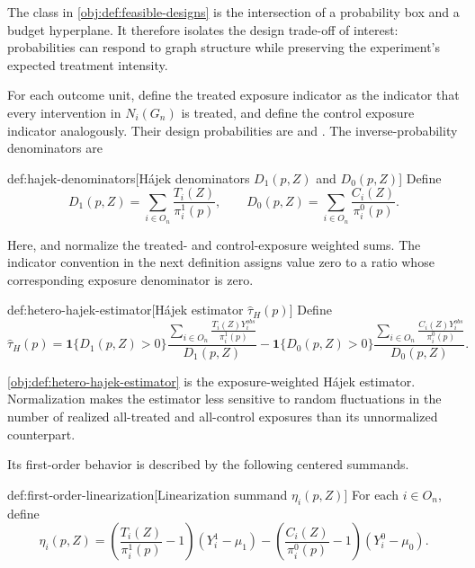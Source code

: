 The class in \cref{obj:def:feasible-designs} is the intersection of a probability box and a budget hyperplane. It therefore isolates the design trade-off of interest: probabilities can respond to graph structure while preserving the experiment's expected treatment intensity.

For each outcome unit, define the treated exposure indicator  as the indicator that every intervention in \(N_i(G_n)\) is treated, and define the control exposure indicator  analogously. Their design probabilities are  and . The inverse-probability denominators are

\begin{definitionv}{def:hajek-denominators}[Hájek denominators $D_1(p,Z)$ and $D_0(p,Z)$]
Define
\[
D_1(p,Z)=\sum_{i\in O_n}\frac{T_i(Z)}{\pi_i^1(p)},
\qquad
D_0(p,Z)=\sum_{i\in O_n}\frac{C_i(Z)}{\pi_i^0(p)}.
\]
\end{definitionv}

Here,  and  normalize the treated- and control-exposure weighted sums. The indicator convention in the next definition assigns value zero to a ratio whose corresponding exposure denominator is zero.

\begin{definitionv}{def:hetero-hajek-estimator}[Hájek estimator $\widehat\tau_H(p)$]
Define
\[
\widehat\tau_H(p)
=
\mathbf 1\{D_1(p,Z)>0\}
\frac{\displaystyle\sum_{i\in O_n}\frac{T_i(Z)Y_i^{obs}}{\pi_i^1(p)}}{D_1(p,Z)}
-
\mathbf 1\{D_0(p,Z)>0\}
\frac{\displaystyle\sum_{i\in O_n}\frac{C_i(Z)Y_i^{obs}}{\pi_i^0(p)}}{D_0(p,Z)}.
\]
\end{definitionv}

\cref{obj:def:hetero-hajek-estimator} is the exposure-weighted Hájek estimator. Normalization makes the estimator less sensitive to random fluctuations in the number of realized all-treated and all-control exposures than its unnormalized counterpart.

Its first-order behavior is described by the following centered summands.

\begin{definitionv}{def:first-order-linearization}[Linearization summand $\eta_i(p,Z)$]
For each \(i\in O_n\), define
\[
\eta_i(p,Z)
=
\left(\frac{T_i(Z)}{\pi_i^1(p)}-1\right)(Y_i^1-\mu_1)
-
\left(\frac{C_i(Z)}{\pi_i^0(p)}-1\right)(Y_i^0-\mu_0).
\]
\end{definitionv}

